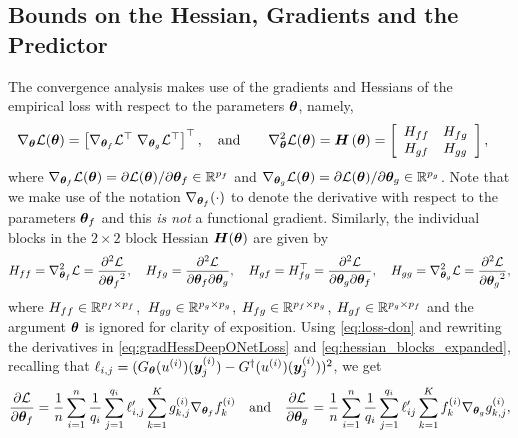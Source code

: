 
\subsection{Bounds on the Hessian, Gradients and the Predictor}


The convergence analysis makes use of the gradients and Hessians of the empirical loss with respect to the parameters ${\bm{\theta}}$, namely, 
\begin{align}
    \nabla_{{\bm{\theta}}} {\mathcal{L}}({\bm{\theta}}) = 
    \begin{bmatrix}
        \nabla_{{\bm{\theta}}_f}{\mathcal{L}}^\top \; \nabla_{{\bm{\theta}}_g}{\mathcal{L}}^\top
    \end{bmatrix}^\top,\quad \text{and} \qquad 
    \nabla_{{\bm{\theta}}}^2{\mathcal{L}}({\bm{\theta}}) = 
    {\bm{H}}
    \left({{\bm{\theta}}}\right) 
    & = \left[
        \begin{array}{c c}
        H_{ff} & H_{fg} \\
        H_{gf} & H_{gg}
        \end{array}
    \right],
    \label{eq:gradHessDeepONetLoss}
\end{align}
where $\nabla_{{\bm{\theta}}_f}{\mathcal{L}}({\bm{\theta}})=\partial {\mathcal{L}}({\bm{\theta}})/\partial{\bm{\theta}}_f\in {\mathbb{R}}^{p_f}$ and  $\nabla_{{\bm{\theta}}_g}{\mathcal{L}}({\bm{\theta}})=\partial {\mathcal{L}}({\bm{\theta}})/\partial{\bm{\theta}}_g\in {\mathbb{R}}^{p_g}$. Note that we make use of the notation $\nabla_{{\bm{\theta}}_f}(\cdot)$ to denote the derivative with respect to the parameters ${\bm{\theta}}_f$ and this \emph{is not} a functional gradient. Similarly, the individual blocks in the $2\times 2$ block Hessian ${\bm{H}}({\bm{\theta}})$ are given by 
\begin{equation}
    H_{ff} = \nabla^2_{{\bm{\theta}}_f}{\mathcal{L}} = {\frac{\partial^2 {\mathcal{L}}}{\partial {{\bm{\theta}}_f}^2}},\quad H_{fg} = \frac{{\partial^2{\mathcal{L}}}}{\partial{\bm{\theta}}_f\partial{\bm{\theta}}_g},\quad H_{gf} = H_{fg}^\top= \frac{{\partial^2{\mathcal{L}}}}{\partial{\bm{\theta}}_g\partial{\bm{\theta}}_f}, \quad H_{gg} = \nabla^2_{{\bm{\theta}}_g}{\mathcal{L}} = {\frac{\partial^2 {\mathcal{L}}}{\partial {{\bm{\theta}}_g}^2}},\label{eq:hessian_blocks_expanded}
\end{equation}
where $H_{ff}\in{\mathbb{R}}^{p_f\times p_f}$,\ $H_{gg}\in{\mathbb{R}}^{p_g\times p_g}$,  $H_{fg}\in{\mathbb{R}}^{p_f\times p_g}$, $H_{gf}\in {\mathbb{R}}^{p_g\times p_f}$ and the argument ${\bm{\theta}}$ is ignored for clarity of exposition. Using \eqref{eq:loss-don} and rewriting the derivatives in \eqref{eq:gradHessDeepONetLoss} and \eqref{eq:hessian_blocks_expanded}, 
recalling that 
$\ell_{i,j}=(G_{{\bm{\theta}}}(u^{(i)})({\bm{y}}_{j}^{(i)})-G^\dagger(u^{(i)})({\bm{y}}^{(i)}_j))^2$, 
we get
\begin{align}
    {\frac{\partial {\mathcal{L}}}{\partial {\bm{\theta}}_f}}
    = 
    \frac{1}{n}\sum_{i=1}^n \frac{1}{q_i} \sum_{j=1}^{q_i} 
    \ell^{\prime}_{i,j} 
    \sum_{k=1}^K g_{k,j}^{(i)} \nabla_{{\bm{\theta}}_f} f_k^{(i)}
    \quad \text{and}\quad
    {\frac{\partial {\mathcal{L}}}{\partial {\bm{\theta}}_g}} 
    =
    \frac{1}{n}\sum_{i=1}^n \frac{1}{q_i} \sum_{j=1}^{q_i} 
    \ell^{\prime}_{ij} 
    \sum_{k=1}^K f_k^{(i)}\nabla_{{\bm{\theta}}_g} g_{k,j}^{(i)},
    \label{eq:Gradients_fully_expanded}
\end{align}
